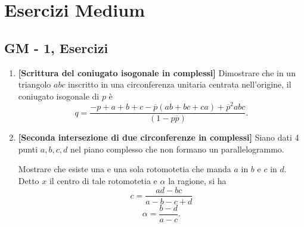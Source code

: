 \section{Esercizi Medium}
\subsection{GM - 1, Esercizi}
\begin{enumerate}
	\item \textbf{[Scrittura del coniugato isogonale in complessi]} Dimostrare che in un triangolo $abc$ inscritto in una
	circonferenza unitaria centrata nell'origine, il coniugato isogonale di $p$ è
	\begin{equation}
	q=\frac{-p+a+b+c-\overline{p}(ab+bc+ca)+\overline{p}^2abc}{(1-p\overline{p})}.
	\end{equation}
	\item \textbf{[Seconda intersezione di due circonferenze in complessi]} Siano dati 4 punti $a, b, c, d$ nel piano complesso che non formano un parallelogrammo.
	
	Mostrare che esiste una e una sola rotomotetia che
	manda $a$ in $b$ e $c$ in $d$. Detto $x$ il centro di tale rotomotetia e $\alpha$ la ragione, si ha
	$$
	c=\frac{ad-bc}{a-b-c+d}
	$$
	$$
	\alpha=\frac{b-d}{a-c}.
	$$
	

\end{enumerate}
